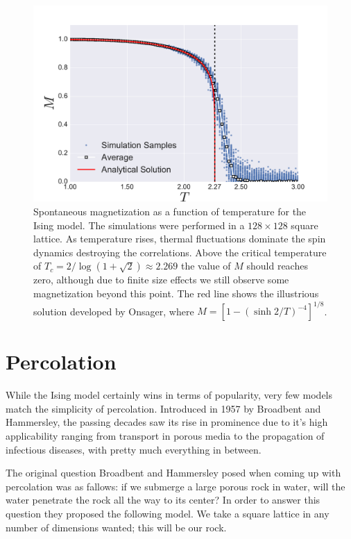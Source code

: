 \begin{figure}
\begin{center}
    \includegraphics[scale=0.4]{chapters/ch2-crit/figs/ising_phase}
\end{center}
\caption{Spontaneous magnetization as a function of temperature for the Ising
    model. The simulations were performed in a $128\times128$ square lattice.
    As temperature rises, thermal fluctuations dominate the spin dynamics
    destroying the correlations. Above the critical temperature of
    $T_c=2/\log(1+\sqrt{2})\approx 2.269$ the value of $M$ should reaches zero,
    although due to finite size effects we still observe some magnetization
    beyond this point. The red line shows the illustrious solution
    developed by Onsager, where $M=[1-(\sinh{2/T})^{-4}]^{1/8}$.}
\label{fig:ising_phase}
\end{figure}


\section{Percolation}
\label{sec:perc}

While the Ising model certainly wins in terms of popularity, very few models
match the simplicity of percolation. Introduced in 1957 by Broadbent and
Hammersley, the passing decades saw its rise in prominence due to it's high
applicability ranging from transport in porous media to the propagation of
infectious diseases, with pretty much everything in between.

The original question Broadbent and Hammersley posed when coming up with
percolation was as fallows: if we submerge a large porous rock in water, will
the water penetrate the rock all the way to its center? In order to answer this
question they proposed the following model. We take a square lattice in any
number of dimensions wanted; this will be our rock.

